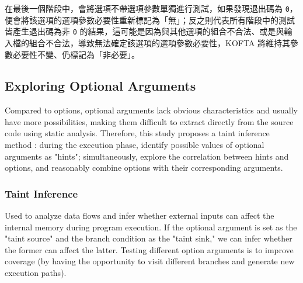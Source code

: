 在最後一個階段中，會將選項不帶選項參數單獨進行測試，如果發現退出碼為 \texttt{0}，便會將該選項的選項參數必要性重新標記為「無」；反之則代表所有階段中的測試皆產生退出碼為非 \texttt{0} 的結果，這可能是因為與其他選項的組合不合法、或是與輸入檔的組合不合法，導致無法確定該選項的選項參數必要性，KOFTA 將維持其參數必要性不變、仍標記為「非必要」。

\fi

\subsection{Exploring Optional Arguments} %
\label{sec:args-explo}

Compared to options, optional arguments lack obvious characteristics and usually have more possibilities, making them difficult to extract directly from the source code using static analysis. Therefore, this study proposes a taint inference method \cite{gan2020greyone}: during the execution phase, identify possible values of optional arguments as "hints"; simultaneously, explore the correlation between hints and options, and reasonably combine options with their corresponding arguments.


\subsubsection{Taint Inference} %
\label{subsec:taint-inference}

Used to analyze data flows and infer whether external inputs can affect the internal memory during program execution.
If the optional argument is set as the "taint source" and the branch condition as the "taint sink," we can infer whether the former can affect the latter. Testing different option arguments is to improve coverage (by having the opportunity to visit different branches and generate new execution paths). %

